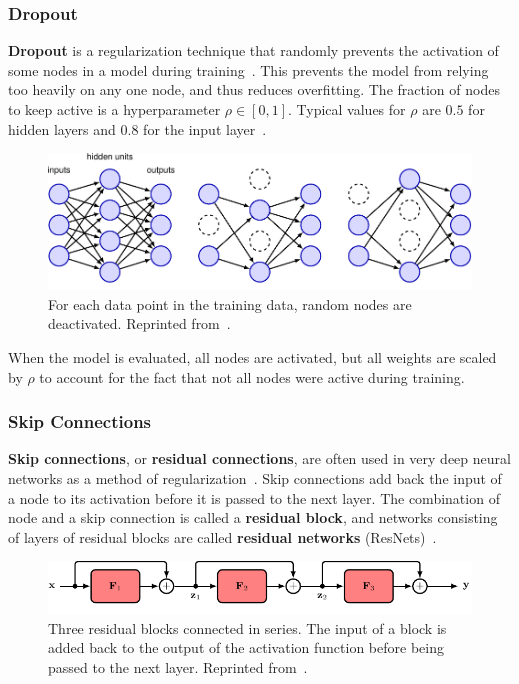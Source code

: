 \documentclass[12pt]{report}
\theoremstyle{definition}
\theoremstyle{remark}
\begin{document}
\subsubsection{Dropout}
\textbf{Dropout} is a regularization technique that randomly prevents the activation of some nodes in a model during training~\cite{srivastava_dropout_2014}. This prevents the model from relying too heavily on any one node, and thus reduces overfitting. The fraction of nodes to keep active is a hyperparameter $\rho \in [0, 1]$. Typical values for $\rho$ are $0.5$ for hidden layers and $0.8$ for the input layer~\cite{bishop_deep_2023}.
\begin{figure}[h]
    \centering
    \includegraphics[width=\linewidth]{figs/dropout.pdf}
    \caption{For each data point in the training data, random nodes are deactivated. Reprinted from~\cite{bishop_deep_2023}.}
    \label{fig:dropout}
\end{figure}
When the model is evaluated, all nodes are activated, but all weights are scaled by $\rho$ to account for the fact that not all nodes were active during training.

\subsubsection{Skip Connections}
\textbf{Skip connections}, or \textbf{residual connections}, are often used in very deep neural networks as a method of regularization~\cite{he_deep_2016,bishop_deep_2023}. Skip connections add back the input of a node to its activation before it is passed to the next layer. The combination of node and a skip connection is called a \textbf{residual block}, and networks consisting of layers of residual blocks are called \textbf{residual networks} (ResNets)~\cite{bishop_deep_2023}.
\begin{figure}[h]
    \centering
    \includegraphics[width=\linewidth]{figs/skip_connection.pdf}
    \caption{Three residual blocks connected in series. The input of a block is added back to the output of the activation function before being passed to the next layer. Reprinted from~\cite{bishop_deep_2023}.}
    \label{fig:residual-block}
\end{figure}
\end{document}
